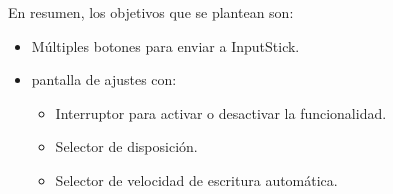 \begin{multicols}{2}[]
    En resumen, los objetivos que se plantean son:
    \begin{itemize}
        \item Múltiples botones para enviar a InputStick.
        \item pantalla de ajustes con:
        \begin{itemize}
            \item Interruptor para activar o desactivar la funcionalidad.
            \item Selector de disposición.
            \item Selector de velocidad de escritura automática.
        \end{itemize}
    \end{itemize}
    \vfill\null %
    \columnbreak
    \begin{figure}[H]
        \centering

\end{figure}
\end{multicols}

